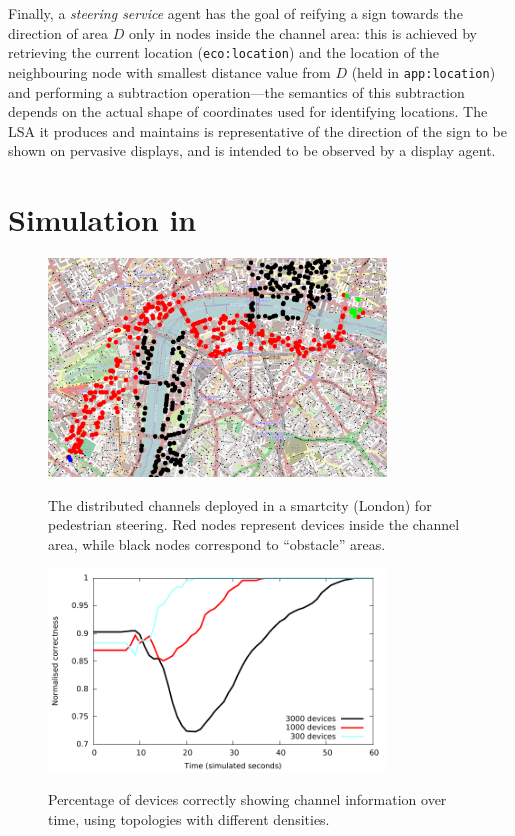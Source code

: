 \documentclass[12pt,a4paper,twoside,openright]{book}
\begin{document}
Finally, a \emph{steering service} agent has the goal of reifying a sign towards the direction of area $D$ only in nodes inside the channel area: this is achieved by retrieving the current location (\texttt{eco:location}) and the location  of the neighbouring node with smallest distance value from $D$ (held in \texttt{app:location}) and performing a subtraction operation---the semantics of this subtraction depends on the actual shape of coordinates used for identifying locations.
%
The LSA it produces and maintains is representative of the direction of the sign to be shown on pervasive displays, and is intended to be observed by a display agent.

\section{Simulation in \alchemist{}}
\label{simulation-channel}

\begin{figure}
\begin{center}{\includegraphics[width=0.8\textwidth]{img/london-channel}}\end{center}
\caption[Channel deployed in London]{The distributed channels deployed in a smartcity (London) for pedestrian steering. Red nodes represent devices inside the channel area, while black nodes correspond to ``obstacle'' areas.}
\label{f:london}
\end{figure}

\begin{figure}
\begin{center}{\includegraphics[width=0.8\textwidth]{img/quality}}\end{center}
\caption[Devices correctly building the channel]{Percentage of devices correctly showing channel information over time, using topologies with different densities.}
\label{f:london2}
\end{figure}
\end{document}
